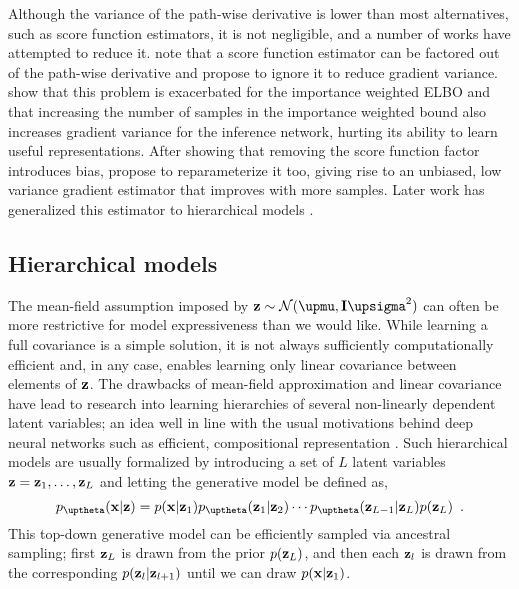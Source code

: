 Although the variance of the path-wise derivative is lower than most alternatives, such as score function estimators, it is not negligible, and a number of works have attempted to reduce it.
\textcite{roeder_sticking_2017} note that a score function estimator can be factored out of the path-wise derivative and propose to ignore it to reduce gradient variance. 
\textcite{rainforth_tighter_2019} show that this problem is exacerbated for the importance weighted ELBO \parencite{burda_importance_2016} and that increasing the number of samples in the importance weighted bound also increases gradient variance for the inference network, hurting its ability to learn useful representations. 
After showing that removing the score function factor introduces bias, \textcite{tucker_doubly_2019} propose to reparameterize it too, giving rise to an unbiased, low variance gradient estimator that improves with more samples. Later work has generalized this estimator to hierarchical models \parencite{bauer_generalized_2021}. 


\subsection{Hierarchical models}\label{sec:hierarchical-vae-background}
The mean-field assumption imposed by $\zb \sim\mathcal{N}(\mub,\mathbf{I}\sigmab^2)$ can often be more restrictive for model expressiveness than we would like. 
While learning a full covariance is a simple solution, it is not always sufficiently computationally efficient and, in any case, enables learning only linear covariance between elements of ${\mathbf{z}}$. 
The drawbacks of mean-field approximation and linear covariance have lead to research into learning hierarchies of several non-linearly dependent latent variables; an idea well in line with the usual motivations behind deep neural networks such as efficient, compositional representation \cite{lecun_deep_2015}. 
Such hierarchical models are usually formalized by introducing a set of $L$ latent variables  ${\mathbf{z}}={\mathbf{z}}_1, \dots, {\mathbf{z}}_L$ and letting the generative model be defined as,
%
\begin{equation}
    p_\thetab(\xb|\zb)=p(\xb|\zb_1) p_\thetab(\zb_1|\zb_2) \cdots p_\thetab(\zb_{L-1}|\zb_L) p(\zb_L) \enspace .
\end{equation}
%
This top-down generative model can be efficiently sampled via ancestral sampling; first ${\mathbf{z}}_L$ is drawn from the prior $p({\mathbf{z}}_L)$, and then each ${\mathbf{z}}_l$ is drawn from the corresponding $p({\mathbf{z}}_l|{\mathbf{z}}_{l+1})$ until we can draw $p({\mathbf{x}}|{\mathbf{z}}_1)$. 

